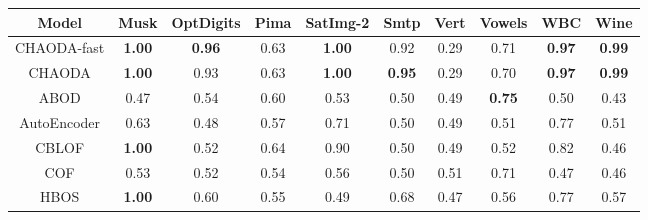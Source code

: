 \begin{table*}[!t]
\begin{center}
\begin{small}
\begin{sc}
\begin{tabular}{|c|c|c|c|c|c|c|c|c|c|}
\hline
\hline

\hline
\textbf{Model} & \textbf{Musk} & \textbf{OptDigits} & \textbf{Pima} & \textbf{SatImg-2} & \textbf{Smtp} & \textbf{Vert} & \textbf{Vowels} &  \textbf{WBC} & \textbf{Wine} \\
\hline
        CHAODA-fast & \textbf{1.00} &      \textbf{0.96} &          0.63 &       \textbf{1.00} &          0.92 &               0.29 &            0.71 & \textbf{0.97} & \textbf{0.99} \\
\hline
        CHAODA & \textbf{1.00} &               0.93 &          0.63 &       \textbf{1.00} & \textbf{0.95} &               0.29 &            0.70 & \textbf{0.97} & \textbf{0.99} \\
\hline
                ABOD &          0.47 &               0.54 &          0.60 &                0.53 &          0.50 &               0.49 &   \textbf{0.75} &          0.50 &          0.43 \\
\hline
        AutoEncoder &          0.63 &               0.48 &          0.57 &                0.71 &          0.50 &               0.49 &            0.51 &          0.77 &          0.51 \\
\hline
                CBLOF & \textbf{1.00} &               0.52 &          0.64 &                0.90 &          0.50 &               0.49 &            0.52 &          0.82 &          0.46 \\
\hline
                COF &          0.53 &               0.52 &          0.54 &                0.56 &          0.50 &               0.51 &            0.71 &          0.47 &          0.46 \\
\hline
                HBOS & \textbf{1.00} &               0.60 &          0.55 &                0.49 &          0.68 &               0.47 &            0.56 &          0.77 &          0.57 \\

\end{tabular}
\end{sc}
\end{small}
\end{center}
\end{table*}
